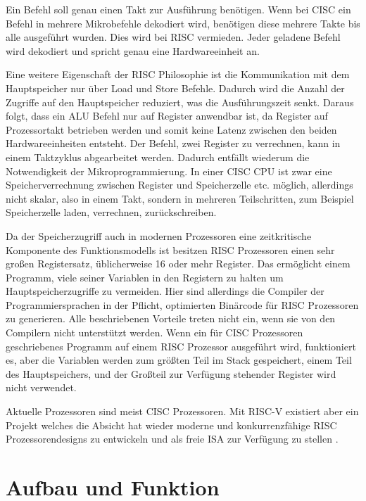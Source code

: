 \documentclass[12pt]{article}
\begin{document}
Ein Befehl soll genau einen Takt zur Ausführung benötigen. Wenn bei CISC ein Befehl in mehrere Mikrobefehle dekodiert wird, benötigen diese mehrere Takte bis alle ausgeführt wurden. Dies wird bei RISC vermieden. Jeder geladene Befehl wird dekodiert und spricht genau eine Hardwareeinheit an.

Eine weitere Eigenschaft der RISC Philosophie ist die Kommunikation mit dem Hauptspeicher nur über Load und Store Befehle. Dadurch wird die Anzahl der Zugriffe auf den Hauptspeicher reduziert, was die Ausführungszeit senkt. Daraus folgt, dass ein ALU Befehl nur auf Register anwendbar ist, da Register auf Prozessortakt betrieben werden und somit keine Latenz zwischen den beiden Hardwareeinheiten entsteht. Der Befehl, zwei Register zu verrechnen, kann in einem Taktzyklus abgearbeitet werden. Dadurch entfällt wiederum die Notwendigkeit der Mikroprogrammierung. In einer CISC CPU ist zwar eine Speicherverrechnung zwischen Register und Speicherzelle etc. möglich, allerdings nicht skalar, also in einem Takt, sondern in mehreren Teilschritten, zum Beispiel Speicherzelle laden, verrechnen, zurückschreiben.


Da der Speicherzugriff auch in modernen Prozessoren eine zeitkritische Komponente des Funktionsmodells ist besitzen RISC Prozessoren einen sehr großen Registersatz, üblicherweise 16 oder mehr Register. Das ermöglicht einem Programm, viele seiner Variablen in den Registern zu halten um Hauptspeicherzugriffe zu vermeiden. Hier sind allerdings die Compiler der Programmiersprachen in der Pflicht, optimierten Binärcode für RISC Prozessoren zu generieren. Alle beschriebenen Vorteile treten nicht ein, wenn sie von den Compilern nicht unterstützt werden. Wenn ein für CISC Prozessoren geschriebenes Programm auf einem RISC Prozessor ausgeführt wird, funktioniert es, aber die Variablen werden zum größten Teil im Stack gespeichert, einem Teil des Hauptspeichers, und der Großteil zur Verfügung stehender Register wird nicht verwendet. 
\par
Aktuelle Prozessoren sind meist CISC Prozessoren. Mit RISC-V existiert aber ein Projekt welches die Absicht hat wieder moderne und konkurrenzfähige RISC Prozessorendesigns zu entwickeln und als freie ISA zur Verfügung zu stellen . 


\section{Aufbau und Funktion}
\end{document}
